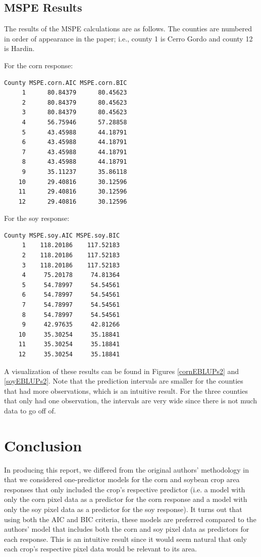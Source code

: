 \documentclass{article}
\begin{document}
\subsection{MSPE Results}

The results of the MSPE calculations are as follows. The counties are numbered in order of appearance in the paper; i.e., county 1 is Cerro Gordo and county 12 is Hardin.
\medbreak

For the corn response:

\begin{verbatim}
County MSPE.corn.AIC MSPE.corn.BIC
     1      80.84379      80.45623
     2      80.84379      80.45623
     3      80.84379      80.45623
     4      56.75946      57.28858
     5      43.45988      44.18791
     6      43.45988      44.18791
     7      43.45988      44.18791
     8      43.45988      44.18791
     9      35.11237      35.86118
    10      29.40816      30.12596
    11      29.40816      30.12596
    12      29.40816      30.12596
\end{verbatim}

For the soy response:

\begin{verbatim}
County MSPE.soy.AIC MSPE.soy.BIC
     1    118.20186    117.52183
     2    118.20186    117.52183
     3    118.20186    117.52183
     4     75.20178     74.81364
     5     54.78997     54.54561
     6     54.78997     54.54561
     7     54.78997     54.54561
     8     54.78997     54.54561
     9     42.97635     42.81266
    10     35.30254     35.18841
    11     35.30254     35.18841
    12     35.30254     35.18841
\end{verbatim}

A visualization of these results can be found in Figures \ref{cornEBLUPs2} and \ref{soyEBLUPs2}. Note that the prediction intervals are smaller for the counties that had more observations, which is an intuitive result. For the three counties that only had one observation, the intervals are very wide since there is not much data to go off of.

\section{Conclusion}

In producing this report, we differed from the original authors' methodology in that we considered one-predictor models for the corn and soybean crop area responses that only included the crop's respective predictor (i.e. a model with only the corn pixel data as a predictor for the corn response and a model with only the soy pixel data as a predictor for the soy response). It turns out that using both the AIC and BIC criteria, these models are preferred compared to the authors' model that includes both the corn and soy pixel data as predictors for each response. This is an intuitive result since it would seem natural that only each crop's respective pixel data would be relevant to its area.
\medbreak
\end{document}
